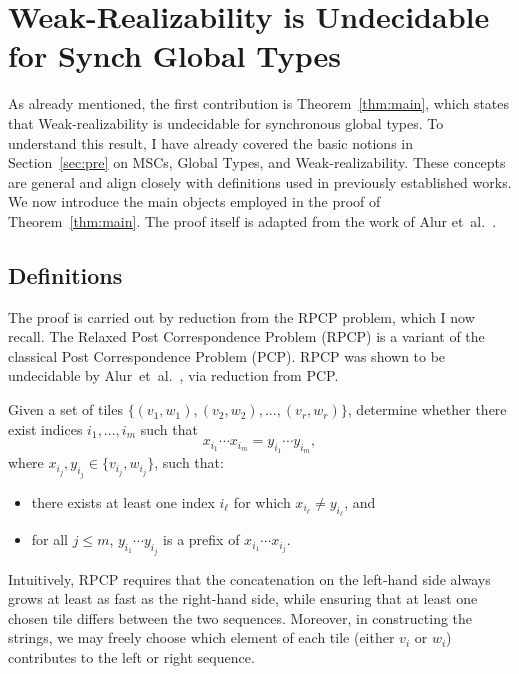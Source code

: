 \chapter{Weak-Realizability is Undecidable for Synch Global Types}\label{sec:proof}

As already mentioned, the first contribution is Theorem~\ref{thm:main},
which states that Weak-realizability is undecidable for synchronous global types. 
To understand this result, I have already covered the basic notions in 
Section~\ref{sec:pre} on MSCs, Global Types, and Weak-realizability. 
These concepts are general and align 
closely with definitions used in previously established works. 
We now introduce the main objects employed in the proof of Theorem~\ref{thm:main}. 
The proof itself is adapted from the work of 
Alur et~al.~\cite{alur2005realizability}. 

\section{Definitions}
The proof is carried out by reduction from the RPCP problem, which I now recall.  
The Relaxed Post Correspondence Problem (RPCP) is a variant of the 
classical Post Correspondence Problem (PCP). RPCP was shown to be 
undecidable by Alur~et~al.~\cite{alur2005realizability}, via reduction 
from PCP.

\bigskip

\begin{definition}
	Given a set of tiles $\{(v_1, w_1), (v_2, w_2), ..., (v_r, w_r)\}$, 
	determine whether there exist indices $i_1, ..., i_m$ such that
	$$x_{i_1}\cdots x_{i_m} = y_{i_1}\cdots y_{i_m},$$
	where $x_{i_j}, y_{i_j} \in \{v_{i_j}, w_{i_j}\}$, such that:
	\begin{itemize}
		\item there exists at least one index $i_\ell$ for which $x_{i_\ell}\neq y_{i_\ell}$, and
		\item for all $j \leq m$, $y_{i_1}\cdots y_{i_j}$ is a prefix of $x_{i_1}\cdots x_{i_j}$.
	\end{itemize}
\end{definition}


Intuitively, RPCP requires that the concatenation on the left-hand side always 
grows at least as fast as the right-hand side, while ensuring that at least one 
chosen tile differs between the two sequences. Moreover, in constructing the 
strings, we may freely choose which element of each tile (either $v_i$ or $w_i$) 
contributes to the left or right sequence.

